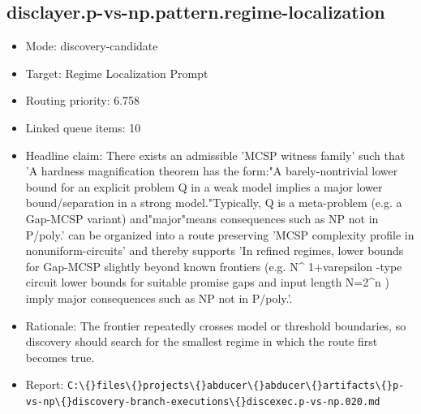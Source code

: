 \documentclass[11pt]{article}
\begin{document}
\subsection*{disclayer.p-vs-np.pattern.regime-localization}
\begin{itemize}
\item Mode: discovery-candidate
\item Target: Regime Localization Prompt
\item Routing priority: 6.758
\item Linked queue items: 10
\item Headline claim: There exists an admissible 'MCSP witness family' such that 'A hardness magnification theorem has the form:"A barely-nontrivial lower bound for an explicit problem Q in a weak model implies a major lower bound/separation in a strong model."Typically, Q is a meta-problem (e.g. a Gap-MCSP variant) and"major"means consequences such as NP not in P/poly.' can be organized into a route preserving 'MCSP complexity profile in nonuniform-circuits' and thereby supports 'In refined regimes, lower bounds for Gap-MCSP slightly beyond known frontiers (e.g. N\textasciicircum{} 1+varepsilon -type circuit lower bounds for suitable promise gaps and input length N=2\textasciicircum{}n ) imply major consequences such as NP not in P/poly.'.
\item Rationale: The frontier repeatedly crosses model or threshold boundaries, so discovery should search for the smallest regime in which the route first becomes true.
\item Report: \texttt{C:\textbackslash\{\}files\textbackslash\{\}projects\textbackslash\{\}abducer\textbackslash\{\}abducer\textbackslash\{\}artifacts\textbackslash\{\}p-vs-np\textbackslash\{\}discovery-branch-executions\textbackslash\{\}discexec.p-vs-np.020.md}
\end{itemize}
\end{document}
